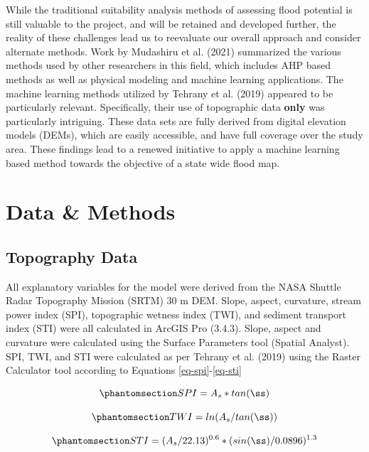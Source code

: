 \documentclass[
]{agujournal2019}
\begin{document}
While the traditional suitability analysis methods of assessing flood
potential is still valuable to the project, and will be retained and
developed further, the reality of these challenges lead us to reevaluate
our overall approach and consider alternate methods. Work by Mudashiru
et al. (2021) summarized the various methods used by other researchers
in this field, which includes AHP based methods as well as physical
modeling and machine learning applications. The machine learning methods
utilized by Tehrany et al. (2019) appeared to be particularly relevant.
Specifically, their use of topographic data \textbf{only} was
particularly intriguing. These data sets are fully derived from digital
elevation models (DEMs), which are easily accessible, and have full
coverage over the study area. These findings lead to a renewed
initiative to apply a machine learning based method towards the
objective of a state wide flood map.

\section{Data \& Methods}\label{sec-data-methods}

\subsection{Topography Data}\label{topography-data}

All explanatory variables for the model were derived from the NASA
Shuttle Radar Topography Mission (SRTM) 30 m DEM. Slope, aspect,
curvature, stream power index (SPI), topographic wetness index (TWI),
and sediment transport index (STI) were all calculated in ArcGIS Pro
(3.4.3). Slope, aspect and curvature were calculated using the Surface
Parameters tool (Spatial Analyst). SPI, TWI, and STI were calculated as
per Tehrany et al. (2019) using the Raster Calculator tool according to
Equations \ref{eq-spi}-\ref{eq-sti}

\begin{equation}\phantomsection\label{eq-spi}{
SPI = A_s * tan(ß)
}\end{equation}

\begin{equation}\phantomsection\label{eq-twi}{
TWI = ln(A_s / tan(ß))
}\end{equation}

\begin{equation}\phantomsection\label{eq-sti}{
STI = (A_s / 22.13)^{0.6} * (sin(ß)/0.0896)^{1.3}
}\end{equation}
\end{document}

